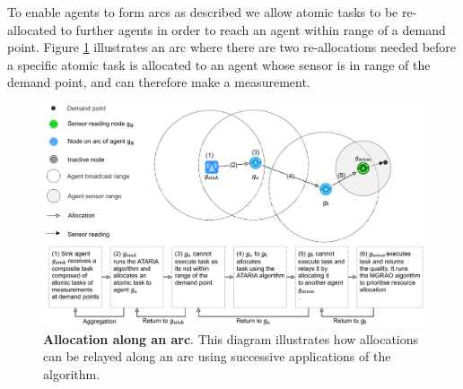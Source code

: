To enable agents to form arcs as described we allow atomic tasks to be re-allocated to further agents in order to reach an agent within range of a demand point. Figure \ref{fig:arc-flow} illustrates an arc where there are two re-allocations needed before a specific atomic task is allocated to an agent whose sensor is in range of the demand point, and can therefore make a measurement.

\begin{figure}[ht]
	\centering
	\includegraphics[width=0.8\linewidth, trim={25pt 0pt 25pt 0pt, clip}]{arc-flow}
	\caption{\textbf{Allocation along an arc}. This diagram illustrates how allocations can be relayed along an arc using successive applications of the \acronymATARIA{}{} algorithm.}
	\label{fig:arc-flow}
\end{figure}

